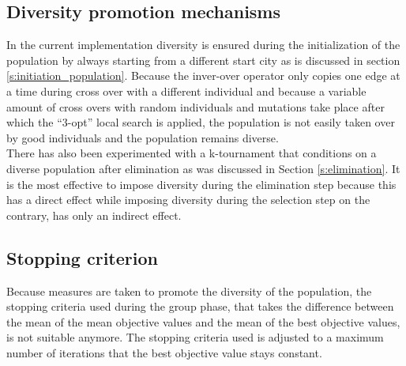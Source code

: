 \documentclass[a4paper,10pt]{article}
\newcommand{\ReplaceMe}[1]{{\color{blue}#1}}
\begin{document}
\subsection{Diversity promotion mechanisms}


In the current implementation diversity is ensured during the initialization of the population by always starting from a different start city as is discussed in section \ref{s:initiation_population}.
Because the inver-over operator only copies one edge at a time during cross over with a different individual and because a variable amount of cross overs with random individuals and mutations take place after which the ``3-opt'' local search is applied, the population is not easily taken over by good individuals and the population remains diverse.\\

There has also been experimented with a k-tournament that conditions on a diverse population after elimination as was discussed in Section \ref{s:elimination}. It is the most effective to impose diversity during the elimination step because this has a direct effect while imposing diversity during the selection step on the contrary, has only an indirect effect. 


\subsection{Stopping criterion}

Because measures are taken to promote the diversity of the population, the stopping criteria used during the group phase, that takes the difference between the mean of the mean objective values and the mean of the best objective values, is not suitable anymore. The stopping criteria used is adjusted to a maximum number of iterations that the best objective value stays constant. 
 \newpage
\end{document}
